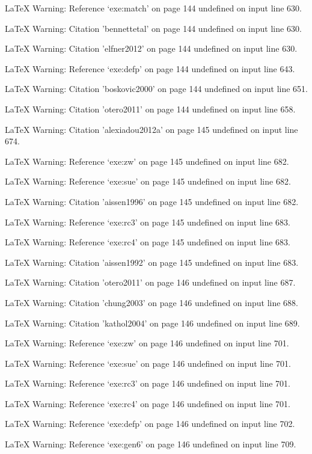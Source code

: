 LaTeX Warning: Reference `exe:match' on page 144 undefined on input line 630.


LaTeX Warning: Citation 'bennettetal' on page 144 undefined on input line 630.


LaTeX Warning: Citation 'elfner2012' on page 144 undefined on input line 630.


LaTeX Warning: Reference `exe:defp' on page 144 undefined on input line 643.


LaTeX Warning: Citation 'boskovic2000' on page 144 undefined on input line 651.


LaTeX Warning: Citation 'otero2011' on page 144 undefined on input line 658.


LaTeX Warning: Citation 'alexiadou2012a' on page 145 undefined on input line 674.


LaTeX Warning: Reference `exe:zw' on page 145 undefined on input line 682.


LaTeX Warning: Reference `exe:sue' on page 145 undefined on input line 682.


LaTeX Warning: Citation 'aissen1996' on page 145 undefined on input line 682.


LaTeX Warning: Reference `exe:rc3' on page 145 undefined on input line 683.


LaTeX Warning: Reference `exe:rc4' on page 145 undefined on input line 683.


LaTeX Warning: Citation 'aissen1992' on page 145 undefined on input line 683.


LaTeX Warning: Citation 'otero2011' on page 146 undefined on input line 687.


LaTeX Warning: Citation 'chung2003' on page 146 undefined on input line 688.


LaTeX Warning: Citation 'kathol2004' on page 146 undefined on input line 689.


LaTeX Warning: Reference `exe:zw' on page 146 undefined on input line 701.


LaTeX Warning: Reference `exe:sue' on page 146 undefined on input line 701.


LaTeX Warning: Reference `exe:rc3' on page 146 undefined on input line 701.


LaTeX Warning: Reference `exe:rc4' on page 146 undefined on input line 701.


LaTeX Warning: Reference `exe:defp' on page 146 undefined on input line 702.


LaTeX Warning: Reference `exe:gen6' on page 146 undefined on input line 709.


